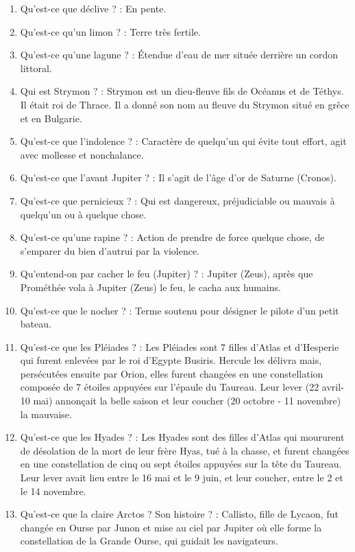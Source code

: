 \documentclass[a4paper, 11pt, hidelinks]{article}
\begin{document}
\begin{enumerate}
      \item Qu'est-ce que déclive ? : En pente.
      \item Qu'est-ce qu'un limon ? : Terre très fertile.
      \item Qu'est-ce qu'une lagune ? : Étendue d'eau de mer située derrière un cordon littoral.
      \item Qui est Strymon ? : Strymon est un dieu-fleuve fils de Océanus et de Téthys. Il était roi de Thrace. Il a donné son nom
            au fleuve du Strymon situé en grêce et en Bulgarie.
      \item Qu'est-ce que l'indolence ? : Caractère de quelqu’un qui évite tout effort, agit avec mollesse et nonchalance.
      \item Qu'est-ce que l'avant Jupiter ? : Il s'agit de l'âge d'or de Saturne (Cronos).
      \item Qu'est-ce que pernicieux ? : Qui est dangereux, préjudiciable ou mauvais à quelqu'un ou à quelque chose.
      \item Qu'est-ce qu'une rapine ? : Action de prendre de force quelque chose, de s'emparer du bien d'autrui par la violence.
      \item Qu'entend-on par cacher le feu (Jupiter) ? : Jupiter (Zeus), après que Prométhée vola à Jupiter (Zeus) le feu, le cacha aux humains.
      \item Qu'est-ce que le nocher ? : Terme soutenu pour désigner le pilote d'un petit bateau.
      \item Qu'est-ce que les Pléiades ? : Les Pléiades sont 7 filles d'Atlas et d'Hesperie qui furent enlevées par le roi d'Egypte Busiris.
            Hercule les délivra mais, persécutées ensuite par Orion, elles furent changées en une constellation composée de 7 étoiles appuyées sur l'épaule
            du Taureau. Leur lever (22 avril-10 mai) annonçait la belle saison et leur coucher (20 octobre - 11 novembre) la mauvaise.
      \item Qu'est-ce que les Hyades ? : Les Hyades sont des filles d'Atlas qui moururent de désolation de la mort de leur frère Hyas,
            tué à la chasse, et furent changées en une constellation de cinq ou sept étoiles appuyées sur la tête du Taureau. Leur lever avait
            lieu entre le 16 mai et le 9 juin, et leur coucher, entre le 2 et le 14 novembre.
      \item Qu'est-ce que la claire Arctos ? Son histoire ? : Callisto, fille de Lycaon, fut changée en Ourse par Junon
            et mise au ciel par Jupiter où elle forme la constellation de la Grande Ourse, qui guidait les navigateurs.

\end{enumerate}
\end{document}
